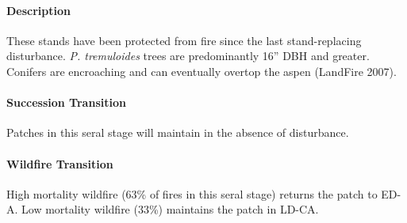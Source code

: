 \paragraph{Description} These stands have been protected from fire since the last stand-replacing disturbance. \emph{P. tremuloides} trees are predominantly 16'' DBH and greater. Conifers are encroaching and can eventually overtop the aspen (LandFire 2007).

\paragraph{Succession Transition} Patches in this seral stage will maintain in the absence of disturbance.

\paragraph{Wildfire Transition} High mortality wildfire (63\% of fires in this seral stage) returns the patch to ED-A. Low mortality wildfire (33\%) maintains the patch in LD-CA.

\noindent\hrulefill




